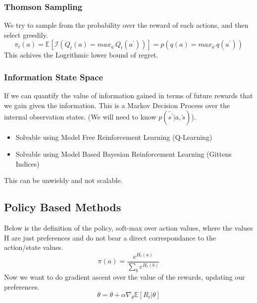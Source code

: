 \subsubsection{Thomson Sampling}

We try to sample from the probability over the reward of each actions, and then select greedily.
\begin{equation}
    \pi_t(a) = \mathbb{E}[\mathcal{I}(Q_t(a) = max_{a^\prime} Q_t(a^\prime))] = p(q(a) = max_{a^\prime} q(a^\prime))
\end{equation}
This achives the Logrithmic lower bound of regret.

\subsubsection{Information State Space}

If we can quantify the value of information gained in terms of future rewards that we gain given the information. This is a Markov Decision Process over the internal observation states. (We will need to know $p(\tilde{s^\prime} \vert a, \tilde{s})$).
\begin{itemize}
    \item Solvable using Model Free Reinforcement Learning (Q-Learning)
    \item Solvable using Model Based Bayesian Reinforcement Learning (Gittens Indices)
\end{itemize}
This can be unwieldy and not scalable.


\subsection{Policy Based Methods}

Below is the definition of the policy, soft-max over action values, where the values H are just preferences and do not bear a direct correspondance to the action/state values.
\begin{equation}
    \pi(a) = \frac{e^{H_t(a)}}{\sum_b e^{H_t(b)}}
\end{equation}
Now we want to do gradient ascent over the value of the rewards, updating our preferences.
\begin{equation}
    \theta = \theta + \alpha \nabla_\theta \mathbb{E}[R_t | \theta]
\end{equation}


